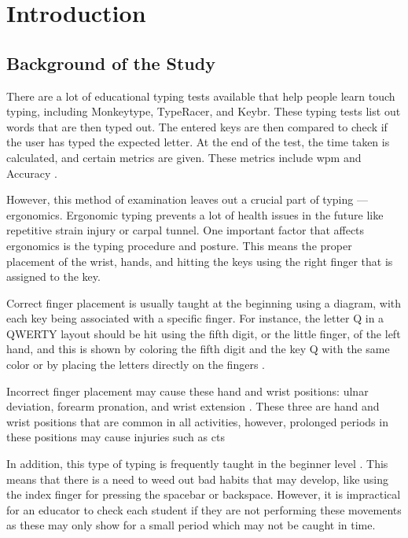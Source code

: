 \documentclass{report}
\begin{document}
\newpage

\printacronyms{}
\newpage

\listoffigures
\newpage

\tableofcontents
\newpage


\chapter{Introduction}


\section{Background of the Study}
There are a lot of educational typing tests available that help people learn
touch typing, including Monkeytype, TypeRacer, and Keybr. These typing tests
list out words that are then typed out. The entered keys are then compared to
check if the user has typed the expected letter. At the end of the test, the
time taken is calculated, and certain metrics are given. These metrics include
\ac{wpm} and Accuracy \parencite{bartnik2021}.

However, this method of examination leaves out a crucial part of typing —
ergonomics. Ergonomic typing prevents a lot of health issues in the future like
repetitive strain injury or carpal tunnel. One important factor that affects
ergonomics is the typing procedure and posture. This means the proper placement of
the wrist, hands, and hitting the keys using the right finger that is assigned
to the key.

Correct finger placement is usually taught at the beginning using a diagram,
with each key being associated with a specific finger. For instance, the letter
Q in a QWERTY layout should be hit using the fifth digit, or the little finger,
of the left hand, and this is shown by coloring the fifth digit and the key Q
with the same color or by placing the letters directly on the fingers
\parencite{dobson2009touch}.

Incorrect finger placement may cause these hand and wrist positions: ulnar
deviation, forearm pronation, and wrist extension \parencite{serina1999}. These
three are hand and wrist positions that are common in all activities, however,
prolonged periods in these positions may cause injuries such as \ac{cts}
\parencite{toosi2015}

In addition, this type of typing is frequently taught in the beginner level
\parencite{donica2018}. This means that there is a need to weed out bad habits
that may develop, like using the index finger for pressing the spacebar or
backspace. However, it is impractical for an educator to check each student if
they are not performing these movements as these may only show for a small
period which may not be caught in time.
\end{document}
